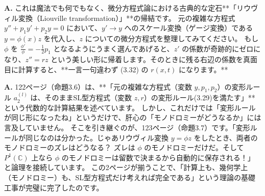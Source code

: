 \vspace{2em}

\begin{Q}[【核心】式(3.32)の $r(x,t)$ は一体どこから湧いてきたのか？]
\textbf{A.} これは魔法でも何でもなく、微分方程式論における古典的な定石**「リウヴィル変換（Liouville transformation）」**の帰結です。
元の複雑な方程式 $y'' + p_1 y' + p_2 y = 0$ において、$y' \to y$ へのスケール変換（ゲージ変換）である $y = \phi(x) z$ を代入し、$z$ についての微分方程式を整理してみてください。
もし $\phi$ を $\frac{\phi'}{\phi} = -\frac{1}{2}p_1$ となるようにうまく選んであげると、$z'$ の係数が奇跡的にゼロになり、$z'' = r z$ という美しい形に帰着します。そのときに残る右辺の係数を真面目に計算すると、**一言一句違わず (3.32) の $r(x,t)$ になります。**
\end{Q}

\begin{Q}
\textbf{A.} 122ページ（命題3.6）は、**「元の複雑な方程式（変数 $y, p_1, p_2$）の変形ルール $a_2^{(l)}$ は、そのままSL型方程式（変数 $z, r$）の変形ルール(3.29)を満たす」**という代数的な計算結果を述べています。
しかし、これだけでは「変形ルールが同じ形になったね」というだけで、肝心の「モノドロミーがどうなるか」には言及していません。
そこを引き継ぐのが、123ページ（命題3.7）です。「変形ルールが同じなのは分かった。じゃあリウヴィル変換 $y = \phi z$ をしたとき、両者のモノドロミーのズレはどうなる？ ズレは $\phi$ のモノドロミーだけだ。そして $P^1(\mathbb{C})$ 上なら $\phi$ のモノドロミーは留数で決まるから自動的に保存される！」と論理を接続しています。
この2ページが揃うことで、「計算上も、幾何学上（モノドロミー）も、SL型方程式だけ考えれば完全である」という理論の基礎工事が完璧に完了したのです。
\end{Q}

